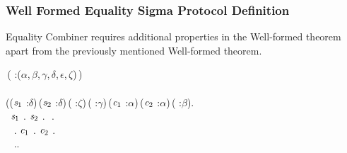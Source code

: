 \subsubsection{Well Formed Equality Sigma Protocol Definition}
Equality Combiner requires additional properties in the Well-formed theorem apart from the previously mentioned Well-formed theorem.

\begin{holmath}
    \,( :(\ensuremath{\alpha},\,\ensuremath{\beta},\,\ensuremath{\gamma},\,\ensuremath{\delta},\,\ensuremath{\epsilon},\,\ensuremath{\zeta})\,)\,\HOLSymConst{\HOLTokenEquiv{}}\\
\,\,\HOLSymConst{\HOLTokenConj{}}\\
(\HOLSymConst{\HOLTokenForall{}}(\ensuremath{\HOLBoundVar{s}\sb{\mathrm{1}}} :\ensuremath{\delta})\,(\ensuremath{\HOLBoundVar{s}\sb{\mathrm{2}}} :\ensuremath{\delta})\,( :\ensuremath{\zeta})\,( :\ensuremath{\gamma})\,(\ensuremath{\HOLBoundVar{c}\sb{\mathrm{1}}} :\ensuremath{\alpha})\,(\ensuremath{\HOLBoundVar{c}\sb{\mathrm{2}}} :\ensuremath{\alpha})\,( :\ensuremath{\beta}).\\
\,\,\,\ensuremath{\HOLBoundVar{s}\sb{\mathrm{1}}}\,\HOLSymConst{\HOLTokenIn{}}\,.\,\HOLSymConst{\HOLTokenConj{}}\,\ensuremath{\HOLBoundVar{s}\sb{\mathrm{2}}}\,\HOLSymConst{\HOLTokenIn{}}\,.\,\HOLSymConst{\HOLTokenConj{}}\,\,\HOLSymConst{\HOLTokenIn{}}\,.\,\HOLSymConst{\HOLTokenConj{}}\\
\,\,\,\,\HOLSymConst{\HOLTokenIn{}}\,.\,\HOLSymConst{\HOLTokenConj{}}\,\ensuremath{\HOLBoundVar{c}\sb{\mathrm{1}}}\,\HOLSymConst{\HOLTokenIn{}}\,.\,\HOLSymConst{\HOLTokenConj{}}\,\ensuremath{\HOLBoundVar{c}\sb{\mathrm{2}}}\,\HOLSymConst{\HOLTokenIn{}}\,.\,\HOLSymConst{\HOLTokenConj{}}\\
\,\,\,\,\HOLSymConst{\HOLTokenIn{}}\,..\,\HOLSymConst{\HOLTokenImp{}}\\

\end{holmath}
